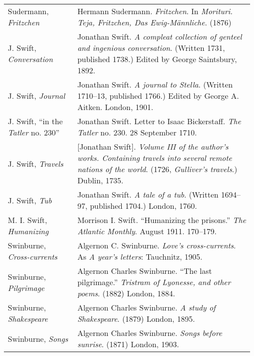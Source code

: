 \begin{longtable}{p{} p{}}
Sudermann, \textit{Fritzchen} & Hermann Sudermann. \textit{Fritzchen}. In \textit{Morituri. Teja, Fritzchen, Das Ewig-Männliche}. (1876) \\
%

J. Swift, \textit{Conversation} & Jonathan Swift. \textit{A compleat collection of genteel and ingenious conversation}. (Written 1731, published 1738.) Edited by George Saintsbury, 1892. \\
J. Swift, \textit{Journal} & Jonathan Swift. \textit{A journal to Stella}. (Written 1710--13, published 1766.) Edited by George A. Aitken. London, 1901. \\
\raggedright{J. Swift, ``in the \textit{Tatler} no. 230''} & Jonathan Swift. Letter to Isaac Bickerstaff. \textit{The Tatler} no. 230. 28 September 1710. \\
J. Swift, \textit{Travels} & [Jonathan Swift]. \textit{Volume III of the author’s works. Containing travels into several remote nations of the world}. (1726, \textit{Gulliver's travels}.) Dublin, 1735. \\
J. Swift, \textit{Tub} & Jonathan Swift. \textit{A tale of a tub}. (Written 1694--97, published 1704.) London, 1760. \\

M. I. Swift, \textit{Humanizing} & Morrison I. Swift. ``Humanizing the prisons.'' \textit{The Atlantic Monthly}. August 1911. 170--179. \\ %

\raggedright {Swinburne, \textit{Cross-currents}} & Algernon C. Swinburne. \textit{Love's cross-currents}. As \textit{A year's letters}: Tauchnitz, 1905.  \\ %
Swinburne, \textit{Pilgrimage} & Algernon Charles Swinburne. ``The last pilgrimage.'' \textit{Tristram of Lyonesse, and other poems}. (1882) London, 1884.  \\
Swinburne, \textit{Shakespeare} & Algernon Charles Swinburne. \textit{A study of Shakespeare}. (1879) London, 1895. \\
Swinburne, \textit{Songs} & Algernon Charles Swinburne. \textit{Songs before sunrise}. (1871) London, 1903. \\


\end{longtable}
